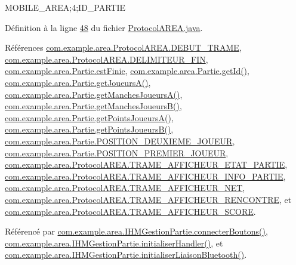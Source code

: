 M\+O\+B\+I\+L\+E\+\_\+\+A\+R\+EA;4;I\+D\+\_\+\+P\+A\+R\+T\+IE~\newline
 

Définition à la ligne \hyperlink{_protocol_a_r_e_a_8java_source_l00048}{48} du fichier \hyperlink{_protocol_a_r_e_a_8java_source}{Protocol\+A\+R\+E\+A.\+java}.



Références \hyperlink{_protocol_a_r_e_a_8java_source_l00031}{com.\+example.\+area.\+Protocol\+A\+R\+E\+A.\+D\+E\+B\+U\+T\+\_\+\+T\+R\+A\+ME}, \hyperlink{_protocol_a_r_e_a_8java_source_l00030}{com.\+example.\+area.\+Protocol\+A\+R\+E\+A.\+D\+E\+L\+I\+M\+I\+T\+E\+U\+R\+\_\+\+F\+IN}, \hyperlink{_partie_8java_source_l00036}{com.\+example.\+area.\+Partie.\+est\+Finie}, \hyperlink{_partie_8java_source_l00112}{com.\+example.\+area.\+Partie.\+get\+Id()}, \hyperlink{_partie_8java_source_l00064}{com.\+example.\+area.\+Partie.\+get\+Joueurs\+A()}, \hyperlink{_partie_8java_source_l00096}{com.\+example.\+area.\+Partie.\+get\+Manches\+Joueurs\+A()}, \hyperlink{_partie_8java_source_l00104}{com.\+example.\+area.\+Partie.\+get\+Manches\+Joueurs\+B()}, \hyperlink{_partie_8java_source_l00080}{com.\+example.\+area.\+Partie.\+get\+Points\+Joueurs\+A()}, \hyperlink{_partie_8java_source_l00088}{com.\+example.\+area.\+Partie.\+get\+Points\+Joueurs\+B()}, \hyperlink{_partie_8java_source_l00029}{com.\+example.\+area.\+Partie.\+P\+O\+S\+I\+T\+I\+O\+N\+\_\+\+D\+E\+U\+X\+I\+E\+M\+E\+\_\+\+J\+O\+U\+E\+UR}, \hyperlink{_partie_8java_source_l00028}{com.\+example.\+area.\+Partie.\+P\+O\+S\+I\+T\+I\+O\+N\+\_\+\+P\+R\+E\+M\+I\+E\+R\+\_\+\+J\+O\+U\+E\+UR}, \hyperlink{_protocol_a_r_e_a_8java_source_l00038}{com.\+example.\+area.\+Protocol\+A\+R\+E\+A.\+T\+R\+A\+M\+E\+\_\+\+A\+F\+F\+I\+C\+H\+E\+U\+R\+\_\+\+E\+T\+A\+T\+\_\+\+P\+A\+R\+T\+IE}, \hyperlink{_protocol_a_r_e_a_8java_source_l00036}{com.\+example.\+area.\+Protocol\+A\+R\+E\+A.\+T\+R\+A\+M\+E\+\_\+\+A\+F\+F\+I\+C\+H\+E\+U\+R\+\_\+\+I\+N\+F\+O\+\_\+\+P\+A\+R\+T\+IE}, \hyperlink{_protocol_a_r_e_a_8java_source_l00039}{com.\+example.\+area.\+Protocol\+A\+R\+E\+A.\+T\+R\+A\+M\+E\+\_\+\+A\+F\+F\+I\+C\+H\+E\+U\+R\+\_\+\+N\+ET}, \hyperlink{_protocol_a_r_e_a_8java_source_l00035}{com.\+example.\+area.\+Protocol\+A\+R\+E\+A.\+T\+R\+A\+M\+E\+\_\+\+A\+F\+F\+I\+C\+H\+E\+U\+R\+\_\+\+R\+E\+N\+C\+O\+N\+T\+RE}, et \hyperlink{_protocol_a_r_e_a_8java_source_l00037}{com.\+example.\+area.\+Protocol\+A\+R\+E\+A.\+T\+R\+A\+M\+E\+\_\+\+A\+F\+F\+I\+C\+H\+E\+U\+R\+\_\+\+S\+C\+O\+RE}.



Référencé par \hyperlink{_i_h_m_gestion_partie_8java_source_l00346}{com.\+example.\+area.\+I\+H\+M\+Gestion\+Partie.\+connecter\+Boutons()}, \hyperlink{_i_h_m_gestion_partie_8java_source_l00291}{com.\+example.\+area.\+I\+H\+M\+Gestion\+Partie.\+initialiser\+Handler()}, et \hyperlink{_i_h_m_gestion_partie_8java_source_l00329}{com.\+example.\+area.\+I\+H\+M\+Gestion\+Partie.\+initialiser\+Liaison\+Bluetooth()}.


